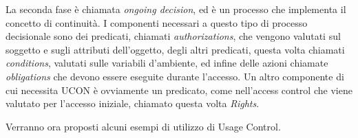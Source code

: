 La seconda fase è chiamata \textit{ongoing decision}, ed è un processo che implementa il concetto di continuità.
I componenti necessari a questo tipo di processo decisionale sono dei predicati, chiamati \textit{authorizations}, che vengono valutati sul soggetto e sugli attributi dell'oggetto, degli altri predicati, questa volta chiamati \textit{conditions}, valutati sulle variabili d'ambiente, ed infine delle azioni chiamate \textit{obligations} che devono essere eseguite durante l'accesso.
Un altro componente di cui necessita UCON è ovviamente un predicato, come nell'access control che viene valutato per l'accesso iniziale, chiamato questa volta \textit{Rights}.\\ \par
{}
Verranno ora proposti alcuni esempi di utilizzo di Usage Control.

